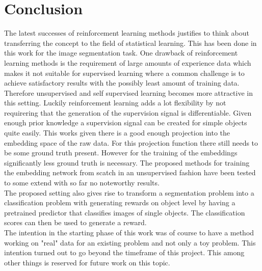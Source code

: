 \chapter{Conclusion}\label{chap:conclus}
The latest successes of reinforcement learning methods justifies to think about transferring the concept to the field of statistical learning. This has been done in this work for the image segmentation task. One drawback of reinforcement learning methods is the requirement of large amounts of experience data which makes it not suitable for supervised learning where a common challenge is to achieve satisfactory results with the possibly least amount of training data.\\
Therefore unsupervised and self supervised learning becomes more attractive in this setting. Luckily reinforcement learning adds a lot flexibility by not requirering that the generation of the supervision signal is differentiable. Given enough prior knowledge a supervision signal can be created for simple objects quite easily. This works given there is a good enough projection into the embedding space of the raw data. For this projection function there still needs to be some ground truth present. However for the training of the embeddings significantly less ground truth is necessary. The proposed methods for training the embedding network from scatch in an unsupervised fashion have been tested to some extend with so far no noteworthy results.\\
The proposed setting also gives rise to transform a segmentation problem into a classification problem with generating rewards on object level by having a pretrained predictor that classifies images of single objects. The classification scores can then be used to generate a reward.\\
The intention in the starting phase of this work was of course to have a method working on "real" data for an existing problem and not only a toy problem. This intention turned out to go beyond the timeframe of this project. This among other things is reserved for future work on this topic.
